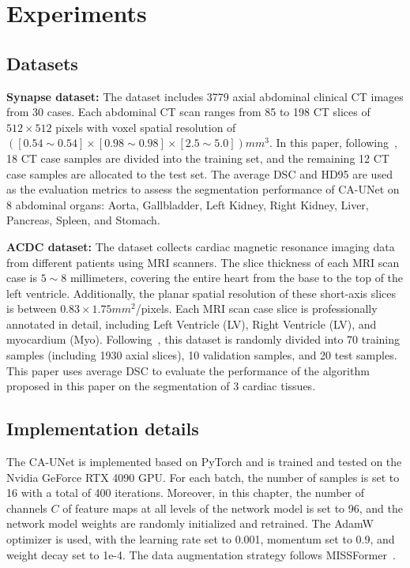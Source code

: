 \section{Experiments}
\subsection{Datasets}
\textbf{Synapse dataset:}  The dataset includes 3779 axial abdominal clinical CT images from 30 cases. Each abdominal CT scan ranges from 85 to 198 CT slices of $512 \times 512$ pixels with voxel spatial resolution of $([0.54\sim 0.54] \times [0.98 \sim 0.98] \times [2.5 \sim 5.0])mm^3$. In this paper, following~\cite{chen2021transunet}, 18 CT case samples are divided into the training set, and the remaining 12 CT case samples are allocated to the test set. The average DSC and HD95 are used as the evaluation metrics to assess the segmentation performance of CA-UNet on 8 abdominal organs: Aorta, Gallbladder, Left Kidney, Right Kidney, Liver, Pancreas, Spleen, and Stomach.



\textbf{ACDC dataset:}  The dataset collects cardiac magnetic resonance imaging data from different patients using MRI scanners. The slice thickness of each MRI scan case is $5\sim8$ millimeters, covering the entire heart from the base to the top of the left ventricle. Additionally, the planar spatial resolution of these short-axis slices is between $0.83 \times 1.75 mm^2$/pixels. Each MRI scan case slice is professionally annotated in detail, including Left Ventricle (LV), Right Ventricle (LV), and myocardium (Myo). Following~\cite{chen2021transunet}, this dataset is randomly divided into 70 training samples (including 1930 axial slices), 10 validation samples, and 20 test samples. This paper uses average DSC to evaluate the performance of the algorithm proposed in this paper on the segmentation of 3 cardiac tissues.


\subsection{Implementation details}
The CA-UNet is implemented based on PyTorch and is trained and tested on the Nvidia GeForce RTX 4090 GPU. For each batch, the number of samples is set to 16 with a total of 400 iterations. Moreover, in this chapter, the number of channels $C$ of feature maps at all levels of the network model is set to 96, and the network model weights are randomly initialized and retrained. The AdamW optimizer is used, with the learning rate set to 0.001, momentum set to 0.9, and weight decay set to 1e-4. The data augmentation strategy follows MISSFormer~\cite{huang2022missformer}.


